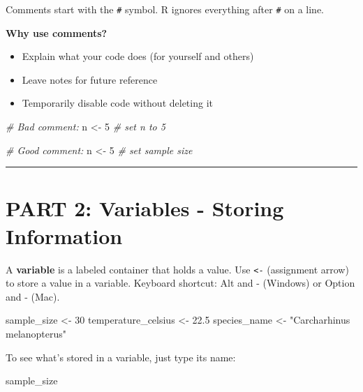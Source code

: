 \documentclass[
]{article}
\newenvironment{Shaded}{\begin{snugshade}}{\end{snugshade}}
\newcommand{\CommentTok}[1]{\textcolor[rgb]{0.56,0.35,0.01}{\textit{#1}}}
\newcommand{\DecValTok}[1]{\textcolor[rgb]{0.00,0.00,0.81}{#1}}
\newcommand{\FloatTok}[1]{\textcolor[rgb]{0.00,0.00,0.81}{#1}}
\newcommand{\NormalTok}[1]{#1}
\newcommand{\OtherTok}[1]{\textcolor[rgb]{0.56,0.35,0.01}{#1}}
\newcommand{\StringTok}[1]{\textcolor[rgb]{0.31,0.60,0.02}{#1}}
\providecommand{\tightlist}{%
  \setlength{\itemsep}{0pt}\setlength{\parskip}{0pt}}
\begin{document}
Comments start with the \texttt{\#} symbol. R ignores everything after
\texttt{\#} on a line.

\textbf{Why use comments?}

\begin{itemize}
\tightlist
\item
  Explain what your code does (for yourself and others)
\item
  Leave notes for future reference
\item
  Temporarily disable code without deleting it
\end{itemize}

\begin{Shaded}
\begin{Highlighting}[]
\CommentTok{\# Bad comment:}
\NormalTok{n }\OtherTok{\textless{}{-}} \DecValTok{5}  \CommentTok{\# set n to 5}

\CommentTok{\# Good comment:}
\NormalTok{n }\OtherTok{\textless{}{-}} \DecValTok{5}  \CommentTok{\# set sample size }
\end{Highlighting}
\end{Shaded}

\begin{center}\rule{0.5\linewidth}{0.5pt}\end{center}

\section{PART 2: Variables - Storing
Information}\label{part-2-variables---storing-information}

A \textbf{variable} is a labeled container that holds a value. Use
\texttt{\textless{}-} (assignment arrow) to store a value in a variable.
Keyboard shortcut: Alt and - (Windows) or Option and - (Mac).

\begin{Shaded}
\begin{Highlighting}[]
\NormalTok{sample\_size }\OtherTok{\textless{}{-}} \DecValTok{30}
\NormalTok{temperature\_celsius }\OtherTok{\textless{}{-}} \FloatTok{22.5}
\NormalTok{species\_name }\OtherTok{\textless{}{-}} \StringTok{"Carcharhinus melanopterus"}
\end{Highlighting}
\end{Shaded}

To see what's stored in a variable, just type its name:

\begin{Shaded}
\begin{Highlighting}[]
\NormalTok{sample\_size}
\end{Highlighting}
\end{Shaded}
\end{document}
